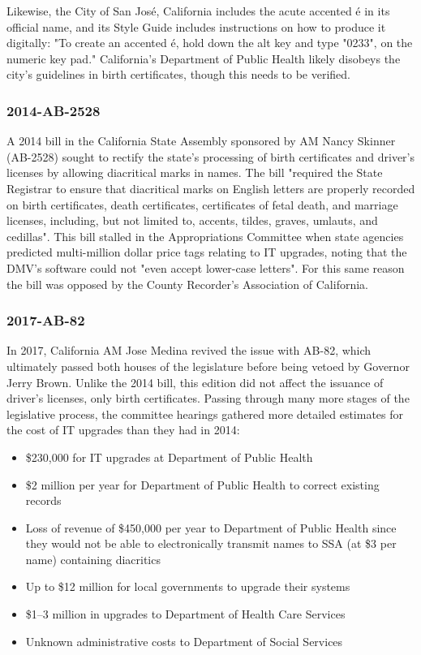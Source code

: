 Likewise, the City of San José, California includes the acute accented é in its
official name, and its Style Guide includes instructions on how to produce it
digitally: "To create an accented é, hold down the alt key and type "0233"‚ on
the numeric key pad." California's Department of Public Health likely disobeys
the city's guidelines in birth certificates, though this needs to be verified.

\subsubsection{2014-AB-2528}

A 2014 bill in the California State Assembly sponsored by AM Nancy Skinner
(AB-2528) sought to rectify the state's processing of birth certificates and
driver's licenses by allowing diacritical marks in names. The bill "required the
State Registrar to ensure that diacritical marks on English letters are properly
recorded on birth certificates, death certificates, certificates of fetal death,
and marriage licenses, including, but not limited to, accents, tildes, graves,
umlauts, and cedillas". \parencite{ab-2528} This bill stalled in the
Appropriations Committee when state agencies predicted multi-million dollar
price tags relating to IT upgrades, noting that the DMV's software could not
"even accept lower-case letters". For this same reason the bill was opposed by
the County Recorder's Association of California.

\subsubsection{2017-AB-82}

In 2017, California AM Jose Medina revived the issue with AB-82, which
ultimately passed both houses of the legislature before being vetoed by
Governor Jerry Brown. Unlike the 2014 bill, this edition did not affect
the issuance of driver's licenses, only birth certificates. Passing
through many more stages of the legislative process, the committee
hearings gathered more detailed estimates for the cost of IT upgrades
than they had in 2014:

\begin{itemize}

\item \$230,000 for IT upgrades at Department of Public Health
\item \$2 million per year for Department of Public Health to correct existing
records
\item Loss of revenue of \$450,000 per year to Department of Public Health since
they would not be able to electronically transmit names to SSA (at \$3 per name)
containing diacritics
\item Up to \$12 million for local governments to upgrade their systems
\item \$1--3 million in upgrades to Department of Health Care Services
\item Unknown administrative costs to Department of Social Services

\end{itemize}

